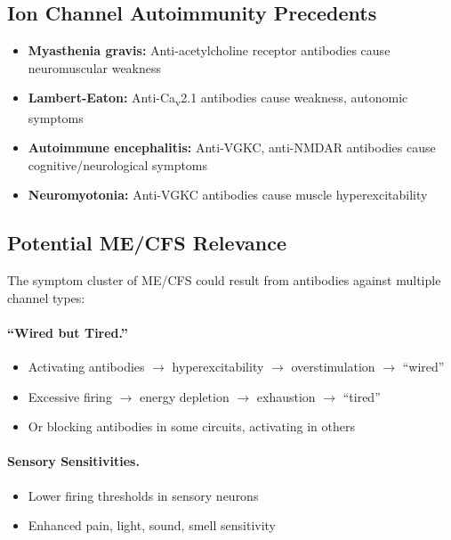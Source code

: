 \subsection{Ion Channel Autoimmunity Precedents}

\begin{itemize}
    \item \textbf{Myasthenia gravis:} Anti-acetylcholine receptor antibodies cause neuromuscular weakness
    \item \textbf{Lambert-Eaton:} Anti-Ca\textsubscript{v}2.1 antibodies cause weakness, autonomic symptoms
    \item \textbf{Autoimmune encephalitis:} Anti-VGKC, anti-NMDAR antibodies cause cognitive/neurological symptoms
    \item \textbf{Neuromyotonia:} Anti-VGKC antibodies cause muscle hyperexcitability
\end{itemize}

\subsection{Potential ME/CFS Relevance}

The symptom cluster of ME/CFS could result from antibodies against multiple channel types:

\paragraph{``Wired but Tired.''}
\begin{itemize}
    \item Activating antibodies $\rightarrow$ hyperexcitability $\rightarrow$ overstimulation $\rightarrow$ ``wired''
    \item Excessive firing $\rightarrow$ energy depletion $\rightarrow$ exhaustion $\rightarrow$ ``tired''
    \item Or blocking antibodies in some circuits, activating in others
\end{itemize}

\paragraph{Sensory Sensitivities.}
\begin{itemize}
    \item Lower firing thresholds in sensory neurons
    \item Enhanced pain, light, sound, smell sensitivity
\end{itemize}

